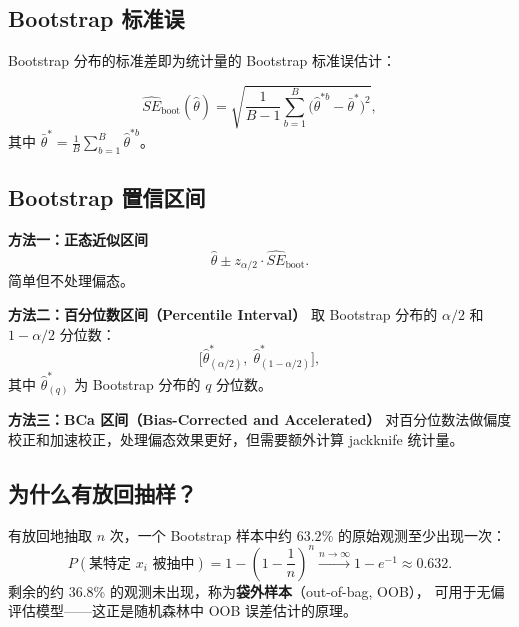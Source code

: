 \subsection{Bootstrap 标准误}

Bootstrap 分布的标准差即为统计量的 Bootstrap 标准误估计：

\begin{equation}
    \boxed{\widehat{SE}_{\text{boot}}(\hat{\theta})
           = \sqrt{\frac{1}{B-1} \sum_{b=1}^{B} \bigl(\hat{\theta}^{*b} - \bar{\theta}^{*}\bigr)^2}},
\end{equation}
其中 $\bar{\theta}^{*} = \frac{1}{B}\sum_{b=1}^{B} \hat{\theta}^{*b}$。

\subsection{Bootstrap 置信区间}

\textbf{方法一：正态近似区间}
\begin{equation}
    \hat{\theta} \pm z_{\alpha/2} \cdot \widehat{SE}_{\text{boot}}.
\end{equation}
简单但不处理偏态。

\textbf{方法二：百分位数区间（Percentile Interval）}
取 Bootstrap 分布的 $\alpha/2$ 和 $1-\alpha/2$ 分位数：
\begin{equation}
    \boxed{\bigl[\hat{\theta}^{*}_{(\alpha/2)},\; \hat{\theta}^{*}_{(1-\alpha/2)}\bigr]},
\end{equation}
其中 $\hat{\theta}^{*}_{(q)}$ 为 Bootstrap 分布的 $q$ 分位数。

\textbf{方法三：BCa 区间（Bias-Corrected and Accelerated）}
对百分位数法做偏度校正和加速校正，处理偏态效果更好，但需要额外计算 jackknife 统计量。

\subsection{为什么有放回抽样？}

有放回地抽取 $n$ 次，一个 Bootstrap 样本中约 $63.2\%$ 的原始观测至少出现一次：
\begin{equation}
    P(\text{某特定 } x_i \text{ 被抽中}) = 1 - \left(1 - \frac{1}{n}\right)^n
                                         \xrightarrow{n \to \infty} 1 - e^{-1} \approx 0.632.
\end{equation}
剩余的约 $36.8\%$ 的观测未出现，称为\textbf{袋外样本}（out-of-bag, OOB），
可用于无偏评估模型——这正是随机森林中 OOB 误差估计的原理。

